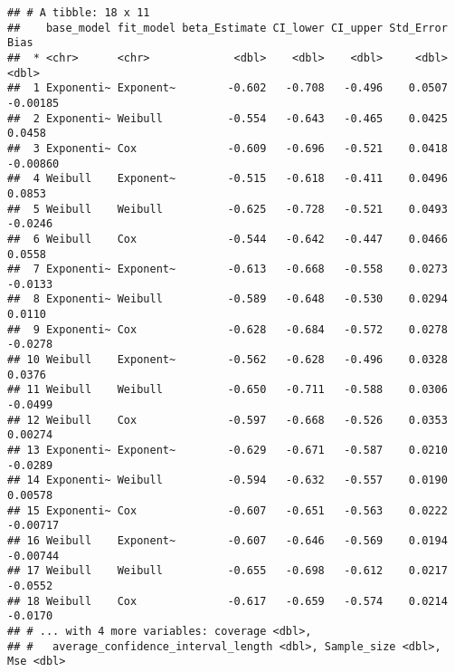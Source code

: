 \documentclass[]{article}
\newenvironment{Shaded}{\begin{snugshade}}{\end{snugshade}}
\newcommand{\KeywordTok}[1]{\textcolor[rgb]{0.13,0.29,0.53}{\textbf{{#1}}}}
\newcommand{\DataTypeTok}[1]{\textcolor[rgb]{0.13,0.29,0.53}{{#1}}}
\newcommand{\StringTok}[1]{\textcolor[rgb]{0.31,0.60,0.02}{{#1}}}
\newcommand{\CommentTok}[1]{\textcolor[rgb]{0.56,0.35,0.01}{\textit{{#1}}}}
\newcommand{\NormalTok}[1]{{#1}}
\begin{document}
\begin{verbatim}
## # A tibble: 18 x 11
##    base_model fit_model beta_Estimate CI_lower CI_upper Std_Error     Bias
##  * <chr>      <chr>             <dbl>    <dbl>    <dbl>     <dbl>    <dbl>
##  1 Exponenti~ Exponent~        -0.602   -0.708   -0.496    0.0507 -0.00185
##  2 Exponenti~ Weibull          -0.554   -0.643   -0.465    0.0425  0.0458 
##  3 Exponenti~ Cox              -0.609   -0.696   -0.521    0.0418 -0.00860
##  4 Weibull    Exponent~        -0.515   -0.618   -0.411    0.0496  0.0853 
##  5 Weibull    Weibull          -0.625   -0.728   -0.521    0.0493 -0.0246 
##  6 Weibull    Cox              -0.544   -0.642   -0.447    0.0466  0.0558 
##  7 Exponenti~ Exponent~        -0.613   -0.668   -0.558    0.0273 -0.0133 
##  8 Exponenti~ Weibull          -0.589   -0.648   -0.530    0.0294  0.0110 
##  9 Exponenti~ Cox              -0.628   -0.684   -0.572    0.0278 -0.0278 
## 10 Weibull    Exponent~        -0.562   -0.628   -0.496    0.0328  0.0376 
## 11 Weibull    Weibull          -0.650   -0.711   -0.588    0.0306 -0.0499 
## 12 Weibull    Cox              -0.597   -0.668   -0.526    0.0353  0.00274
## 13 Exponenti~ Exponent~        -0.629   -0.671   -0.587    0.0210 -0.0289 
## 14 Exponenti~ Weibull          -0.594   -0.632   -0.557    0.0190  0.00578
## 15 Exponenti~ Cox              -0.607   -0.651   -0.563    0.0222 -0.00717
## 16 Weibull    Exponent~        -0.607   -0.646   -0.569    0.0194 -0.00744
## 17 Weibull    Weibull          -0.655   -0.698   -0.612    0.0217 -0.0552 
## 18 Weibull    Cox              -0.617   -0.659   -0.574    0.0214 -0.0170 
## # ... with 4 more variables: coverage <dbl>,
## #   average_confidence_interval_length <dbl>, Sample_size <dbl>, Mse <dbl>
\end{verbatim}

\begin{Shaded}
\end{Shaded}
\end{document}
